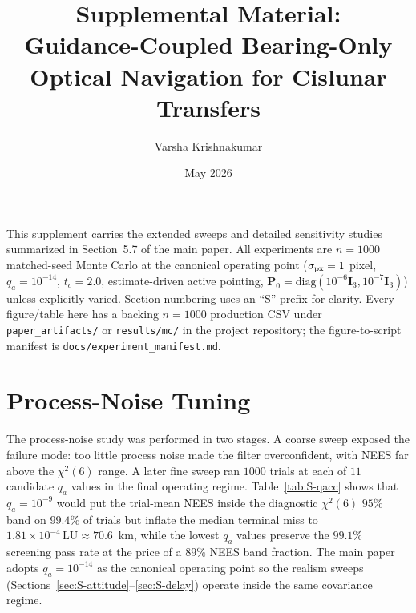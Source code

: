 \documentclass[10pt]{article}
\title{\vspace{-0.35in}Supplemental Material:\\
Guidance-Coupled Bearing-Only Optical Navigation for Cislunar Transfers}
\author{Varsha Krishnakumar}
\date{May 2026}
\newcommand{\vect}[1]{\mathbf{#1}}
\newcommand{\mat}[1]{\mathbf{#1}}
\newcommand{\LU}{\mathrm{LU}}
\newcommand{\chisq}{\chi^2}
\begin{document}
\maketitle

This supplement carries the extended sweeps and detailed sensitivity studies summarized in Section~5.7 of the main paper.  All experiments are $n=1000$ matched-seed Monte Carlo at the canonical operating point ($\sigma_{\rm px}=1$ pixel, $q_a=10^{-14}$, $t_c=2.0$, estimate-driven active pointing, $\vect{P}_0=\mathrm{diag}(10^{-6}\mat{I}_3,10^{-7}\mat{I}_3)$) unless explicitly varied.  Section-numbering uses an ``S'' prefix for clarity.  Every figure/table here has a backing $n=1000$ production CSV under \texttt{paper\_artifacts/} or \texttt{results/mc/} in the project repository; the figure-to-script manifest is \texttt{docs/experiment\_manifest.md}.

\section{Process-Noise Tuning}
\label{sec:S-qacc}
The process-noise study was performed in two stages.  A coarse sweep exposed the failure mode: too little process noise made the filter overconfident, with NEES far above the $\chisq(6)$ range.  A later fine sweep ran $1000$ trials at each of $11$ candidate $q_a$ values in the final operating regime.  Table~\ref{tab:S-qacc} shows that $q_a=10^{-9}$ would put the trial-mean NEES inside the diagnostic $\chisq(6)$ $95\%$ band on $99.4\%$ of trials but inflate the median terminal miss to $1.81\times10^{-4}\,\LU\approx 70.6$~km, while the lowest $q_a$ values preserve the $99.1\%$ screening pass rate at the price of a $89\%$ NEES band fraction.  The main paper adopts $q_a=10^{-14}$ as the canonical operating point so the realism sweeps (Sections~\ref{sec:S-attitude}--\ref{sec:S-delay}) operate inside the same covariance regime.
\end{document}
